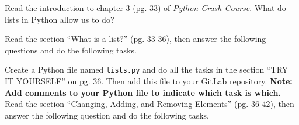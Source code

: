 \documentclass[a4paper,addpoints]{exam}
\begin{document}
\vspace{20pt}
\begin{questions}
    \question[10] Read the introduction to chapter 3 (pg. 33) of \textit{Python Crash Course}.
        What do lists in Python allow us to do?
        \begin{solutionorlines}[\stretch{1}]
        \end{solutionorlines}
    \question[20] Read the section ``What is a list?'' (pg. 33-36), then answer the following questions and do the following tasks.
        \question[10] Create a Python file named \texttt{lists.py} and do all the tasks in the section ``TRY IT YOURSELF'' on pg. 36.
            Then add this file to your GitLab repository.
        \textbf{Note: Add comments to your Python file to indicate which task is which.}
        \question[20] Read the section ``Changing, Adding, and Removing Elements'' (pg. 36-42), then answer the following question and do the following tasks. 
        \begin{parts}

\end{parts}
\end{questions}
\end{document}
